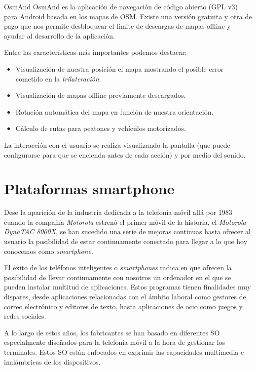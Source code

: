 \begin{definitionlist}
  \item[OsmAnd] OsmAnd es la aplicación de navegación de código abierto (GPL v3) para Android basada
    en los mapas de \acf{OSM}. Existe una versión gratuita y otra de pago que nos permite
    desbloquear el limite de descargas de mapas offline y ayudar al desarrollo de la aplicación.

    Entre las características más importantes podemos destacar:

    \begin{itemize}
      \item Visualización de nuestra posición el mapa mostrando el posible error cometido en la
        \emph{trilateración}.
      \item Visualización de mapas offline previamente descargados.
      \item Rotación automática del mapa en función de nuestra orientación.
      \item Cálculo de rutas para peatones y vehículos motorizados.
    \end{itemize}

    La interacción con el usuario se realiza visualizando la pantalla (que puede configurarse para
    que se encienda antes de cada acción) y por medio del sonido.

\end{definitionlist}

\section{Plataformas smartphone}
\label{sec:plataformas}

Dese la aparición de la industria dedicada a la telefonía móvil allá por 1983 cuando la compañía
\emph{Motorola} estrenó el primer móvil de la historia, el \emph{Motorola DynaTAC 8000X}, se han
sucedido una serie de mejoras continuas hasta ofrecer al usuario la posibilidad de estar
continuamente conectado para llegar a lo que hoy conocemos como \emph{smartphone}.

El éxito de los teléfonos inteligentes o \emph{smartphones} radica en que ofrecen la posibilidad de
llevar continuamente con nosotros un ordenador en el que se pueden instalar multitud de
aplicaciones. Estos programas tienen finalidades muy dispares, desde aplicaciones relacionadas con
el ámbito laboral como gestores de correo electrónico y editores de texto, hasta aplicaciones de
ocio como juegos y redes sociales.

A lo largo de estos años, los fabricantes se han basado en diferentes \acf{SO} especialmente
diseñados para la telefonía móvil a la hora de gestionar los terminales. Estos \acs{SO} están
enfocados en exprimir las capacidades multimedia e inalámbricas de los dispositivos.

